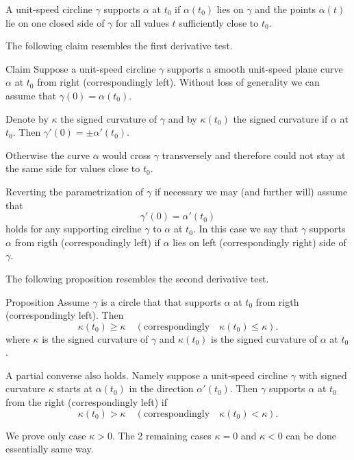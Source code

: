 A unit-speed circline $\gamma$ supports $\alpha$ at $t_0$ if $\alpha(t_0)$ lies on $\gamma$
and the points $\alpha(t)$ lie on one closed side of $\gamma$ for all values $t$ sufficiently close to $t_0$.

The following claim resembles the first derivative test.

\begin{thm}{Claim}
Suppose a unit-speed circline $\gamma$ supports a smooth unit-speed plane curve $\alpha$ at $t_0$ from right (correspondingly left).
Without loss of generality we can assume that $\gamma(0)=\alpha(t_0)$.

Denote by $\kappa$ the signed curvature of $\gamma$ and by $\kappa(t_0)$ the signed curvature if $\alpha$ at $t_0$. 
Then $\gamma'(0)=\pm\alpha'(t_0)$.
\end{thm}

Otherwise the curve $\alpha$ would cross $\gamma$ transversely and therefore could not stay at the same side for values close to $t_0$.

Reverting the parametrization of $\gamma$ if necessary we may (and further will) assume that 
\[\gamma'(0)=\alpha'(t_0)\]
holds for any supporting circline $\gamma$ to $\alpha$ at $t_0$.
In this case we say that $\gamma$ supports $\alpha$ from rigth (correspondingly left) if $\alpha$ lies on left (correspondingly right) side of $\gamma$.

The following proposition resembles the second derivative test. 

\begin{thm}{Proposition}\label{prop:supporting-circline}
Assume $\gamma$ is a circle that that supports $\alpha$ at $t_0$ from rigth (correspondingly left).  
Then 
\[\kappa(t_0)\ge \kappa
\quad(\text{correspondingly}\quad\kappa(t_0)\le \kappa).
\] 
where $\kappa$ is the signed curvature of $\gamma$ 
and $\kappa(t_0)$ is the signed curvature of $\alpha$ at $t_0$.

A partial converse also holds.
Namely suppose a unit-speed circline $\gamma$ with signed curvature $\kappa$ starts at $\alpha(t_0)$ in the direction $\alpha'(t_0)$.
Then $\gamma$ supports $\alpha$ at $t_0$ from the right (correspondingly left) if 
\[\kappa(t_0)> \kappa
\quad(\text{correspondingly}\quad\kappa(t_0)< \kappa).
\]

\end{thm}

We prove only case $\kappa>0$.
The 2 remaining cases $\kappa=0$ and $\kappa<0$ can be done essentially same way.


